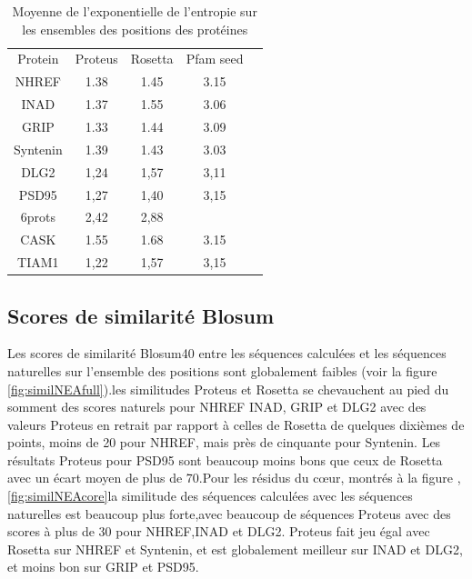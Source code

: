     \begin{table}[!htbp]
      \centering

      \begin{tabular}{ccccc}

        \toprule
        Protein & Proteus & Rosetta & Pfam seed \\
        \cmidrule{1-4}
        NHREF  & 1.38 & 1.45 & 3.15  \\
        INAD  & 1.37 & 1.55 & 3.06  \\
        GRIP  & 1.33 & 1.44 & 3.09  \\
        Syntenin  & 1.39 & 1.43 & 3.03  \\
        DLG2  & 1,24 & 1,57 & 3,11  \\
        PSD95  & 1,27 & 1,40 & 3,15  \\
        6prots & 2,42  & 2,88 &    \\
        \cmidrule{1-5}
        CASK  & 1.55 & 1.68 & 3.15  \\
        TIAM1 & 1,22 & 1,57 & 3,15  \\

        \bottomrule

      \end{tabular}      
      \caption{Moyenne de l'exponentielle de l'entropie sur les ensembles des positions des protéines}
\label{tab:Entropie_PDZ}      
    \end{table}

        
\subsection{Scores de similarité Blosum}

Les scores de similarité Blosum40 entre les séquences calculées et les séquences naturelles sur l'ensemble des positions sont globalement faibles (voir la figure \ref{fig:similNEAfull}).les similitudes Proteus et Rosetta se chevauchent au pied du somment des scores naturels pour NHREF INAD, GRIP et DLG2 avec des valeurs Proteus en retrait  par rapport à celles de Rosetta de quelques dixièmes de points, moins de 20 pour NHREF, mais près de cinquante pour Syntenin. Les résultats Proteus pour PSD95 sont beaucoup moins bons que ceux de Rosetta avec un écart moyen de plus de 70.Pour les résidus du cœur, montrés à la figure , \ref{fig:similNEAcore}la similitude des séquences calculées avec les séquences naturelles est beaucoup plus forte,avec beaucoup de séquences Proteus avec des scores à plus de 30 pour NHREF,INAD et DLG2. Proteus fait jeu égal avec Rosetta sur NHREF et Syntenin, et est globalement meilleur sur INAD et DLG2, et moins bon sur GRIP et PSD95. 


